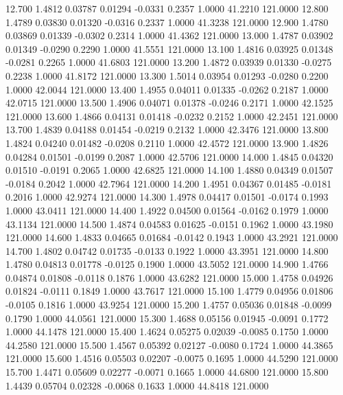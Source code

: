   12.700   1.4812   0.03787   0.01294  -0.0331   0.2357   1.0000  41.2210 121.0000
  12.800   1.4789   0.03830   0.01320  -0.0316   0.2337   1.0000  41.3238 121.0000
  12.900   1.4780   0.03869   0.01339  -0.0302   0.2314   1.0000  41.4362 121.0000
  13.000   1.4787   0.03902   0.01349  -0.0290   0.2290   1.0000  41.5551 121.0000
  13.100   1.4816   0.03925   0.01348  -0.0281   0.2265   1.0000  41.6803 121.0000
  13.200   1.4872   0.03939   0.01330  -0.0275   0.2238   1.0000  41.8172 121.0000
  13.300   1.5014   0.03954   0.01293  -0.0280   0.2200   1.0000  42.0044 121.0000
  13.400   1.4955   0.04011   0.01335  -0.0262   0.2187   1.0000  42.0715 121.0000
  13.500   1.4906   0.04071   0.01378  -0.0246   0.2171   1.0000  42.1525 121.0000
  13.600   1.4866   0.04131   0.01418  -0.0232   0.2152   1.0000  42.2451 121.0000
  13.700   1.4839   0.04188   0.01454  -0.0219   0.2132   1.0000  42.3476 121.0000
  13.800   1.4824   0.04240   0.01482  -0.0208   0.2110   1.0000  42.4572 121.0000
  13.900   1.4826   0.04284   0.01501  -0.0199   0.2087   1.0000  42.5706 121.0000
  14.000   1.4845   0.04320   0.01510  -0.0191   0.2065   1.0000  42.6825 121.0000
  14.100   1.4880   0.04349   0.01507  -0.0184   0.2042   1.0000  42.7964 121.0000
  14.200   1.4951   0.04367   0.01485  -0.0181   0.2016   1.0000  42.9274 121.0000
  14.300   1.4978   0.04417   0.01501  -0.0174   0.1993   1.0000  43.0411 121.0000
  14.400   1.4922   0.04500   0.01564  -0.0162   0.1979   1.0000  43.1134 121.0000
  14.500   1.4874   0.04583   0.01625  -0.0151   0.1962   1.0000  43.1980 121.0000
  14.600   1.4833   0.04665   0.01684  -0.0142   0.1943   1.0000  43.2921 121.0000
  14.700   1.4802   0.04742   0.01735  -0.0133   0.1922   1.0000  43.3951 121.0000
  14.800   1.4780   0.04813   0.01778  -0.0125   0.1900   1.0000  43.5052 121.0000
  14.900   1.4766   0.04874   0.01808  -0.0118   0.1876   1.0000  43.6282 121.0000
  15.000   1.4758   0.04926   0.01824  -0.0111   0.1849   1.0000  43.7617 121.0000
  15.100   1.4779   0.04956   0.01806  -0.0105   0.1816   1.0000  43.9254 121.0000
  15.200   1.4757   0.05036   0.01848  -0.0099   0.1790   1.0000  44.0561 121.0000
  15.300   1.4688   0.05156   0.01945  -0.0091   0.1772   1.0000  44.1478 121.0000
  15.400   1.4624   0.05275   0.02039  -0.0085   0.1750   1.0000  44.2580 121.0000
  15.500   1.4567   0.05392   0.02127  -0.0080   0.1724   1.0000  44.3865 121.0000
  15.600   1.4516   0.05503   0.02207  -0.0075   0.1695   1.0000  44.5290 121.0000
  15.700   1.4471   0.05609   0.02277  -0.0071   0.1665   1.0000  44.6800 121.0000
  15.800   1.4439   0.05704   0.02328  -0.0068   0.1633   1.0000  44.8418 121.0000
